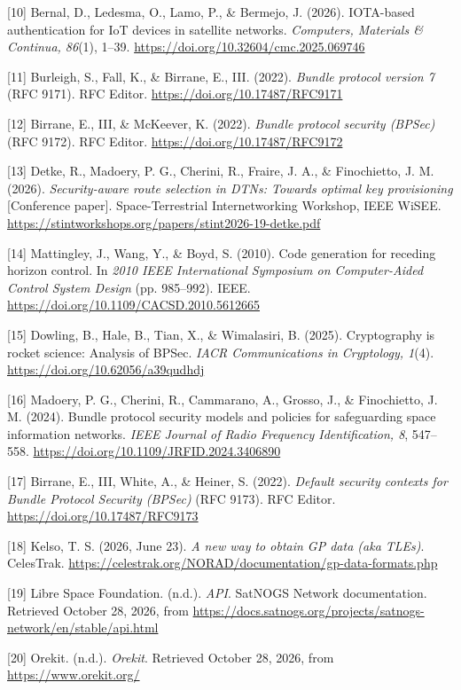 \documentclass[12pt,a4paper]{article}
\begin{document}
\noindent\hangindent=0.7cm [10] Bernal, D., Ledesma, O., Lamo, P., \& Bermejo, J. (2026). IOTA-based authentication for IoT devices in satellite networks. \textit{Computers, Materials \& Continua, 86}(1), 1--39. \url{https://doi.org/10.32604/cmc.2025.069746}\par
\noindent\hangindent=0.7cm [11] Burleigh, S., Fall, K., \& Birrane, E., III. (2022). \textit{Bundle protocol version 7} (RFC 9171). RFC Editor. \url{https://doi.org/10.17487/RFC9171}\par
\noindent\hangindent=0.7cm [12] Birrane, E., III, \& McKeever, K. (2022). \textit{Bundle protocol security (BPSec)} (RFC 9172). RFC Editor. \url{https://doi.org/10.17487/RFC9172}\par
\noindent\hangindent=0.7cm [13] Detke, R., Madoery, P. G., Cherini, R., Fraire, J. A., \& Finochietto, J. M. (2026). \textit{Security-aware route selection in DTNs: Towards optimal key provisioning} [Conference paper]. Space-Terrestrial Internetworking Workshop, IEEE WiSEE. \url{https://stintworkshops.org/papers/stint2026-19-detke.pdf}\par
\noindent\hangindent=0.7cm [14] Mattingley, J., Wang, Y., \& Boyd, S. (2010). Code generation for receding horizon control. In \textit{2010 IEEE International Symposium on Computer-Aided Control System Design} (pp. 985--992). IEEE. \url{https://doi.org/10.1109/CACSD.2010.5612665}\par
\noindent\hangindent=0.7cm [15] Dowling, B., Hale, B., Tian, X., \& Wimalasiri, B. (2025). Cryptography is rocket science: Analysis of BPSec. \textit{IACR Communications in Cryptology, 1}(4). \url{https://doi.org/10.62056/a39qudhdj}\par
\noindent\hangindent=0.7cm [16] Madoery, P. G., Cherini, R., Cammarano, A., Grosso, J., \& Finochietto, J. M. (2024). Bundle protocol security models and policies for safeguarding space information networks. \textit{IEEE Journal of Radio Frequency Identification, 8}, 547--558. \url{https://doi.org/10.1109/JRFID.2024.3406890}\par
\noindent\hangindent=0.7cm [17] Birrane, E., III, White, A., \& Heiner, S. (2022). \textit{Default security contexts for Bundle Protocol Security (BPSec)} (RFC 9173). RFC Editor. \url{https://doi.org/10.17487/RFC9173}\par
\noindent\hangindent=0.7cm [18] Kelso, T. S. (2026, June 23). \textit{A new way to obtain GP data (aka TLEs)}. CelesTrak. \url{https://celestrak.org/NORAD/documentation/gp-data-formats.php}\par
\noindent\hangindent=0.7cm [19] Libre Space Foundation. (n.d.). \textit{API}. SatNOGS Network documentation. Retrieved October 28, 2026, from \url{https://docs.satnogs.org/projects/satnogs-network/en/stable/api.html}\par
\noindent\hangindent=0.7cm [20] Orekit. (n.d.). \textit{Orekit}. Retrieved October 28, 2026, from \url{https://www.orekit.org/}\par
\end{document}

